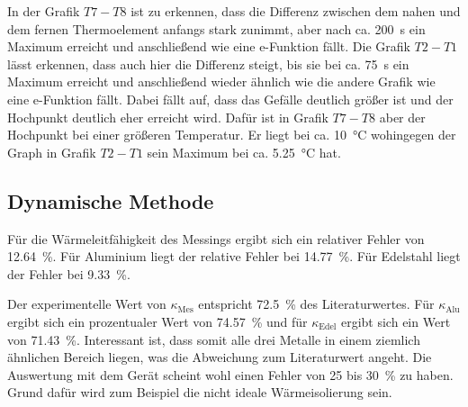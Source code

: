 In der Grafik $T7-T8$ ist zu erkennen, dass die Differenz zwischen dem nahen und dem fernen Thermoelement anfangs stark zunimmt, aber nach ca. 
\SI{200}{\second} ein Maximum erreicht und anschließend wie eine e-Funktion fällt. Die Grafik $T2-T1$ lässt erkennen, dass auch hier die 
Differenz steigt, bis sie bei ca. \SI{75}{\second} ein Maximum erreicht und anschließend wieder ähnlich wie die andere Grafik wie eine 
e-Funktion fällt. Dabei fällt auf, dass das Gefälle deutlich größer ist und der Hochpunkt deutlich eher erreicht wird. Dafür ist in Grafik 
$T7-T8$ aber der Hochpunkt bei einer größeren Temperatur. Er liegt bei ca. \SI{10}{\degreeCelsius} wohingegen der Graph in Grafik $T2-T1$ sein %
Maximum bei ca. \SI{5.25}{\degreeCelsius} hat.

\subsection{Dynamische Methode}
Für die Wärmeleitfähigkeit des Messings ergibt sich ein relativer Fehler von \SI{12.64}{\percent}. Für Aluminium liegt der relative 
Fehler bei \SI{14.77}{\percent}. Für Edelstahl liegt der Fehler bei \SI{9.33}{\percent}. 

\noindent Der experimentelle Wert von $\kappa_\text{Mes}$ entspricht \SI{72.5}{\percent} des Literaturwertes. 
Für $\kappa_\text{Alu}$ ergibt sich ein prozentualer Wert von \SI{74.57}{\percent} und für $\kappa_\text{Edel}$ ergibt sich ein Wert 
von \SI{71.43}{\percent}. Interessant ist, dass somit alle drei Metalle in einem ziemlich ähnlichen Bereich liegen, was die Abweichung zum 
Literaturwert angeht. 
Die Auswertung mit dem Gerät scheint wohl einen Fehler von \num{25} bis \SI{30}{\percent} zu haben. Grund dafür wird zum Beispiel die 
nicht ideale Wärmeisolierung sein.



